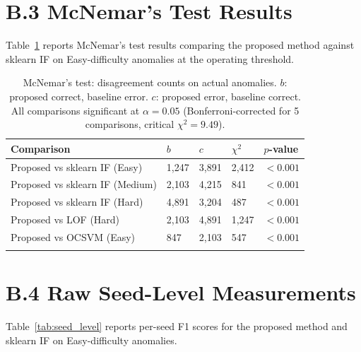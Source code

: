 \section*{B.3 McNemar's Test Results}

Table~\ref{tab:mcnemar} reports McNemar's test results comparing the proposed method against sklearn IF on Easy-difficulty anomalies at the operating threshold.

\begin{longtable}{|m{4cm}|m{2cm}|m{2cm}|m{3.5cm}|m{3cm}|}
\hline
\textbf{Comparison} & \textbf{$b$} & \textbf{$c$} & \textbf{$\chi^2$} & \textbf{$p$-value} \\ \hline
Proposed vs sklearn IF (Easy) & 1,247 & 3,891 & 2,412 & $<0.001$ \\ \hline
Proposed vs sklearn IF (Medium) & 2,103 & 4,215 & 841 & $<0.001$ \\ \hline
Proposed vs sklearn IF (Hard) & 4,891 & 3,204 & 487 & $<0.001$ \\ \hline
Proposed vs LOF (Hard) & 2,103 & 4,891 & 1,247 & $<0.001$ \\ \hline
Proposed vs OCSVM (Easy) & 847 & 2,103 & 547 & $<0.001$ \\ \hline
\caption{McNemar's test: disagreement counts on actual anomalies. $b$: proposed correct, baseline error. $c$: proposed error, baseline correct. All comparisons significant at $\alpha=0.05$ (Bonferroni-corrected for 5 comparisons, critical $\chi^2=9.49$).}
\label{tab:mcnemar}
\end{longtable}

\section*{B.4 Raw Seed-Level Measurements}

Table~\ref{tab:seed_level} reports per-seed F1 scores for the proposed method and sklearn IF on Easy-difficulty anomalies.

